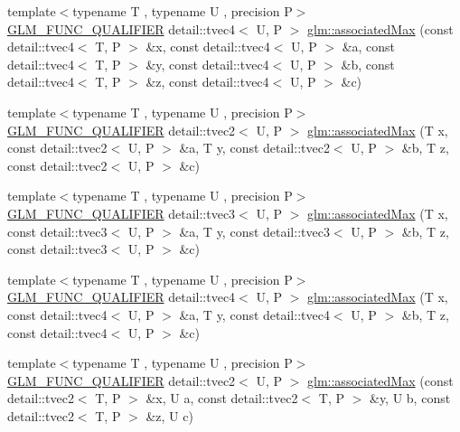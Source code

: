\begin{DoxyCompactItemize}
{\footnotesize template$<$typename T , typename U , precision P$>$ }\\\hyperlink{setup_8hpp_a33fdea6f91c5f834105f7415e2a64407}{G\+L\+M\+\_\+\+F\+U\+N\+C\+\_\+\+Q\+U\+A\+L\+I\+F\+I\+ER} detail\+::tvec4$<$ U, P $>$ \hyperlink{namespaceglm_afdf990bf8674c1e728c5664e22a52408}{glm\+::associated\+Max} (const detail\+::tvec4$<$ T, P $>$ \&x, const detail\+::tvec4$<$ U, P $>$ \&a, const detail\+::tvec4$<$ T, P $>$ \&y, const detail\+::tvec4$<$ U, P $>$ \&b, const detail\+::tvec4$<$ T, P $>$ \&z, const detail\+::tvec4$<$ U, P $>$ \&c)
\item 
{\footnotesize template$<$typename T , typename U , precision P$>$ }\\\hyperlink{setup_8hpp_a33fdea6f91c5f834105f7415e2a64407}{G\+L\+M\+\_\+\+F\+U\+N\+C\+\_\+\+Q\+U\+A\+L\+I\+F\+I\+ER} detail\+::tvec2$<$ U, P $>$ \hyperlink{namespaceglm_a466c6dd94844a19306e9ee8a2f9eee2f}{glm\+::associated\+Max} (T x, const detail\+::tvec2$<$ U, P $>$ \&a, T y, const detail\+::tvec2$<$ U, P $>$ \&b, T z, const detail\+::tvec2$<$ U, P $>$ \&c)
\item 
{\footnotesize template$<$typename T , typename U , precision P$>$ }\\\hyperlink{setup_8hpp_a33fdea6f91c5f834105f7415e2a64407}{G\+L\+M\+\_\+\+F\+U\+N\+C\+\_\+\+Q\+U\+A\+L\+I\+F\+I\+ER} detail\+::tvec3$<$ U, P $>$ \hyperlink{namespaceglm_a3921c9a8740abd10014acacb21d1822b}{glm\+::associated\+Max} (T x, const detail\+::tvec3$<$ U, P $>$ \&a, T y, const detail\+::tvec3$<$ U, P $>$ \&b, T z, const detail\+::tvec3$<$ U, P $>$ \&c)
\item 
{\footnotesize template$<$typename T , typename U , precision P$>$ }\\\hyperlink{setup_8hpp_a33fdea6f91c5f834105f7415e2a64407}{G\+L\+M\+\_\+\+F\+U\+N\+C\+\_\+\+Q\+U\+A\+L\+I\+F\+I\+ER} detail\+::tvec4$<$ U, P $>$ \hyperlink{namespaceglm_a3c336bee3c720fd04904466779376d20}{glm\+::associated\+Max} (T x, const detail\+::tvec4$<$ U, P $>$ \&a, T y, const detail\+::tvec4$<$ U, P $>$ \&b, T z, const detail\+::tvec4$<$ U, P $>$ \&c)
\item 
{\footnotesize template$<$typename T , typename U , precision P$>$ }\\\hyperlink{setup_8hpp_a33fdea6f91c5f834105f7415e2a64407}{G\+L\+M\+\_\+\+F\+U\+N\+C\+\_\+\+Q\+U\+A\+L\+I\+F\+I\+ER} detail\+::tvec2$<$ U, P $>$ \hyperlink{namespaceglm_a1bff89aba9a245cf4976d6b7fb66ddd8}{glm\+::associated\+Max} (const detail\+::tvec2$<$ T, P $>$ \&x, U a, const detail\+::tvec2$<$ T, P $>$ \&y, U b, const detail\+::tvec2$<$ T, P $>$ \&z, U c)

\end{DoxyCompactItemize}
